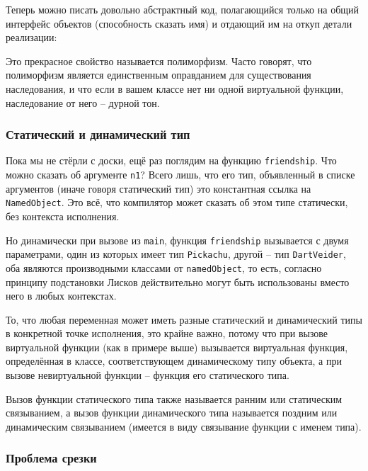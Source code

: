 \documentclass[a4paper,12pt,oneside]{article}
\begin{document}


Теперь можно писать довольно абстрактный код, полагающийся только на общий интерфейс объектов (способность сказать имя) и отдающий им на откуп детали реализации:



Это прекрасное свойство называется полиморфизм. Часто говорят, что полиморфизм является единственным оправданием для существования наследования, и что если в вашем классе нет ни одной виртуальной функции, наследование от него – дурной тон. 

\subsubsection{Статический и динамический тип}

Пока мы не стёрли с доски, ещё раз поглядим на функцию \lstinline!friendship!. Что можно сказать об аргументе \lstinline!n1!? Всего лишь, что его тип, объявленный в списке аргументов (иначе говоря статический тип) это константная ссылка на \lstinline!NamedObject!. Это всё, что компилятор может сказать об этом типе статически, без контекста исполнения.

Но динамически при вызове из \lstinline!main!, функция \lstinline!friendship! вызывается с двумя параметрами, один из которых имеет тип \lstinline!Pickachu!, другой – тип \lstinline!DartVeider!, оба являются производными классами от \lstinline!namedObject!, то есть, согласно принципу подстановки Лисков действительно могут быть использованы вместо него в любых контекстах.

То, что любая переменная может иметь разные статический и динамический типы в конкретной точке исполнения, это крайне важно, потому что при вызове виртуальной функции (как в примере выше) вызывается виртуальная функция, определённая в классе, соответствующем динамическому типу объекта, а при вызове невиртуальной функции – функция его статического типа.

Вызов функции статического типа также называется ранним или статическим связыванием, а вызов функции динамического типа называется поздним или динамическим связыванием (имеется в виду связывание функции с именем типа).

\subsubsection{Проблема срезки}\label{Cutting}
\end{document}
